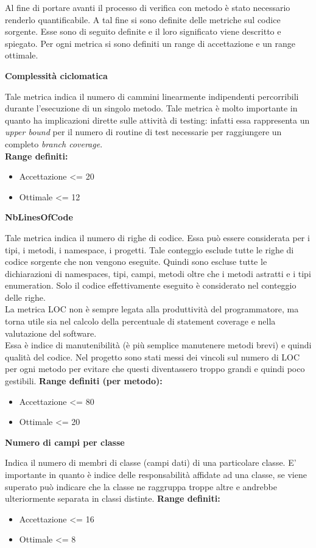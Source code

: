Al fine di portare avanti il processo di verifica con metodo è stato necessario renderlo quantificabile. A tal fine si sono definite delle metriche sul codice sorgente. Esse sono di seguito definite e il loro significato viene descritto e spiegato. Per ogni metrica si sono definiti un range di accettazione e un range ottimale. \\

{\large \textbf{Complessità ciclomatica}\par} 
Tale metrica indica il numero di cammini linearmente indipendenti percorribili durante l'esecuzione di un singolo metodo. Tale metrica è molto importante in quanto ha implicazioni dirette sulle attività di testing: infatti essa rappresenta un \textit{upper bound} per il numero di routine di test necessarie per raggiungere un completo \textit{branch coverage}. \\ 
\textbf{Range definiti:}
\begin{itemize}
	\item Accettazione \textless = 20
	\item Ottimale \textless = 12
\end{itemize}

{\large \textbf{NbLinesOfCode}\par} 
Tale metrica indica il numero di righe di codice. Essa può essere considerata per i tipi, i metodi, i namespace, i progetti. Tale conteggio esclude tutte le righe di codice sorgente che non vengono eseguite. Quindi sono escluse tutte le dichiarazioni di namespaces, tipi, campi, metodi oltre che i metodi astratti e i tipi enumeration. Solo il codice effettivamente eseguito è considerato nel conteggio delle righe.\\
La metrica LOC non è sempre legata alla produttività del programmatore, ma torna utile sia nel calcolo della percentuale di statement coverage e nella valutazione del software. \\
Essa è indice di manutenibilità (è più semplice manutenere metodi brevi) e quindi qualità del codice. Nel progetto sono stati messi dei vincoli sul numero di LOC per ogni metodo per evitare che questi diventassero troppo grandi e quindi poco gestibili.
\textbf{Range definiti (per metodo):}
\begin{itemize}
	\item Accettazione \textless = 80
	\item Ottimale \textless = 20
\end{itemize}

{\large \textbf{Numero di campi per classe}\par} 
Indica il numero di membri di classe (campi dati) di una particolare classe. E' importante in quanto è indice delle responsabilità affidate ad una classe, se viene superato può indicare che la classe ne raggruppa troppe altre e andrebbe ulteriormente separata in classi distinte.
\textbf{Range definiti:}
\begin{itemize}
	\item Accettazione \textless = 16
	\item Ottimale \textless = 8
\end{itemize}

